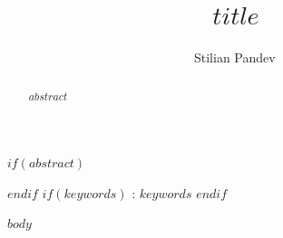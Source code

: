 \documentclass[12pt]{iopart}
\begin{document}
\title[Barrow $$\Delta \le 1$$ from a long-range entanglement network]{$title$}
\author{Stilian Pandev\,}
\address{Independent researcher}
$if(abstract)$\begin{abstract}$abstract$\end{abstract}$endif$
$if(keywords)$
\vspace{1pc}: $keywords$
$endif$
\maketitle
$body$


\end{document}
